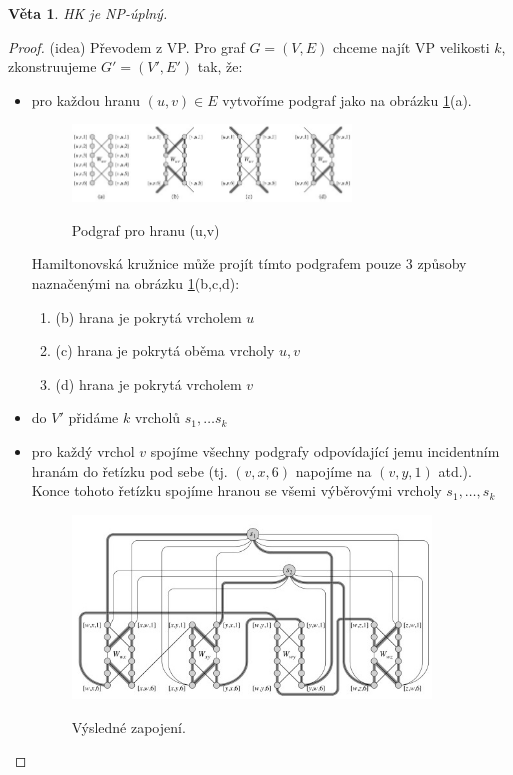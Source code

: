 \documentclass[11pt]{report} %
\newtheorem{theorem}{Věta}[section]
\numberwithin{equation}{section}
\begin{document}
\begin{theorem}
	HK je NP-úplný.
\end{theorem}
\begin{proof}(idea)
Převodem z VP. Pro graf $G = (V,E)$ chceme najít VP velikosti $k$, zkonstruujeme $G' = (V', E')$ tak, že:
\begin{itemize}
	\item pro každou hranu $(u,v) \in E$ vytvoříme podgraf jako na obrázku \ref{ham1}(a).
	\begin{figure}[H]
		\centering
		\includegraphics[width=0.7\textwidth]{img/hamilton1.jpg}
		\label{ham1}
		\caption{Podgraf pro hranu (u,v)}
	\end{figure}
	Hamiltonovská kružnice může projít tímto podgrafem pouze 3 způsoby naznačenými na obrázku \ref{ham1}(b,c,d): 
	\begin{enumerate}
		
		
		\item (b) hrana je pokrytá vrcholem $u$
		\item (c) hrana je pokrytá oběma vrcholy $u, v$
		\item (d) hrana je pokrytá vrcholem $v$
	\end{enumerate}

	\item do $V'$ přidáme $k$  vrcholů $s_1, \dots s_k$
	
	\item pro každý vrchol $v$ spojíme všechny podgrafy odpovídající jemu incidentním hranám do řetízku pod sebe (tj. $(v,x,6)$ napojíme na $(v,y,1)$ atd.). Konce tohoto řetízku spojíme hranou se všemi výběrovými vrcholy $s_1, \dots, s_k$
	
	\begin{figure}[H]
		\centering
		\includegraphics[width=0.9\textwidth]{img/hamilton2.jpg}
		\label{ham2}
		\caption{Výsledné zapojení.}
	\end{figure}
\end{itemize}
\end{proof}
\end{document}

